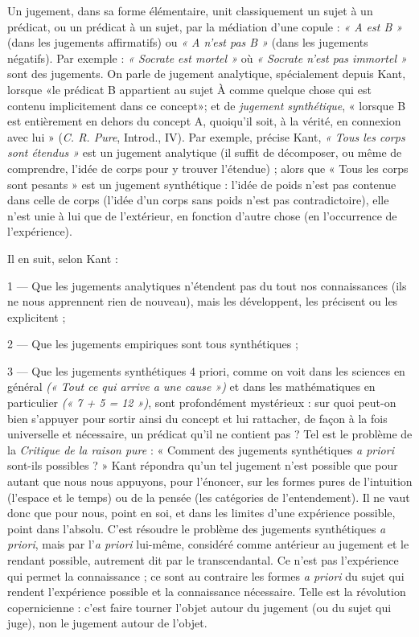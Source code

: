 {Un jugement, dans sa forme élémentaire, unit classiquement un sujet à un
prédicat, ou un prédicat à un sujet, par la médiation d’une copule : {\it « A est B »}
(dans les jugements affirmatifs) ou {\it « A n'est pas B »} (dans les jugements négatifs).
Par exemple : {\it « Socrate est mortel »} où {\it « Socrate n'est pas immortel »} sont
des jugements. On parle de jugement analytique, spécialement depuis Kant,
lorsque «le prédicat B appartient au sujet À comme quelque chose qui est
contenu implicitement dans ce concept»; et de {\it jugement synthétique},
« lorsque B est entièrement en dehors du concept A, quoiqu'il soit, à la vérité,
en connexion avec lui » ({\it C. R. Pure}, Introd., IV). Par exemple, précise Kant,
{\it « Tous les corps sont étendus »} est un jugement analytique (il suffit de décomposer,
ou même de comprendre, l’idée de corps pour y trouver l'étendue) ;
alors que « Tous les corps sont pesants » est un jugement synthétique : l’idée de
poids n’est pas contenue dans celle de corps (l’idée d’un corps sans poids n’est
pas contradictoire), elle n’est unie à lui que de l’extérieur, en fonction d’autre
chose (en l'occurrence de l’expérience).

Il en suit, selon Kant :

1 — Que les jugements analytiques n’étendent pas du tout nos connaissances
(ils ne nous apprennent rien de nouveau), mais les développent, les précisent
ou les explicitent ;

2 — Que les jugements empiriques sont tous synthétiques ;

3 — Que les jugements synthétiques 4 priori, comme on voit dans les
sciences en général {\it (« Tout ce qui arrive a une cause »)} et dans les mathématiques
en particulier {\it (« 7 + 5 = 12 »)}, sont profondément mystérieux : sur quoi
peut-on bien s’appuyer pour sortir ainsi du concept et lui rattacher, de façon à
la fois universelle et nécessaire, un prédicat qu’il ne contient pas ? Tel est le problème
de la {\it Critique de la raison pure} : « Comment des jugements synthétiques
{\it a priori} sont-ils possibles ? » Kant répondra qu’un tel jugement n’est possible
que pour autant que nous nous appuyons, pour l’énoncer, sur les formes pures
de l'intuition (l’espace et le temps) ou de la pensée (les catégories de l’entendement).
Il ne vaut donc que pour nous, point en soi, et dans les limites d’une
expérience possible, point dans l’absolu. C’est résoudre le problème des jugements
synthétiques {\it a priori}, mais par l'{\it a priori} lui-même, considéré comme
antérieur au jugement et le rendant possible, autrement dit par le transcendantal.
Ce n’est pas l'expérience qui permet la connaissance ; ce sont au
contraire les formes {\it a priori} du sujet qui rendent l’expérience possible et la
connaissance nécessaire. Telle est la révolution copernicienne : c’est faire
tourner l’objet autour du jugement (ou du sujet qui juge), non le jugement
autour de l’objet.

}

